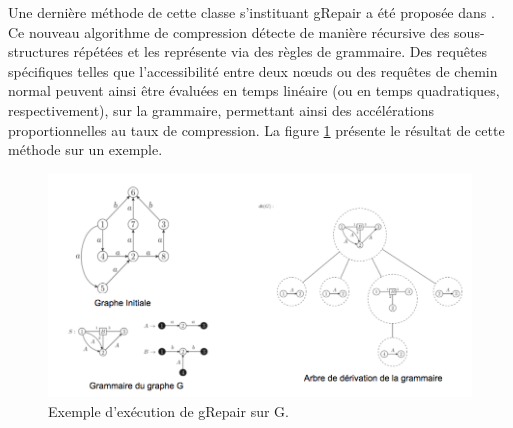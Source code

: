 	Une dernière méthode de cette classe s'instituant gRepair a été proposée dans \citep{maneth2018grammar}. Ce nouveau algorithme de compression détecte de manière récursive des sous-structures répétées et les représente via des règles de grammaire.  Des requêtes spécifiques telles que l'accessibilité entre deux nœuds ou des requêtes de chemin normal peuvent ainsi être évaluées en temps linéaire (ou en temps quadratiques, respectivement), sur la grammaire, permettant ainsi des accélérations proportionnelles au taux de compression. La figure \ref{gRepair} présente le résultat de cette méthode sur un exemple. 
	
	\begin{figure}[h]
			\includegraphics[scale=0.5,center]{./ressources/image/grepair.png}
			\caption[Exemple d'exécution de gRepair sur G.]{Exemple d'exécution de gRepair sur G.}
			\label{gRepair}
	\end{figure}